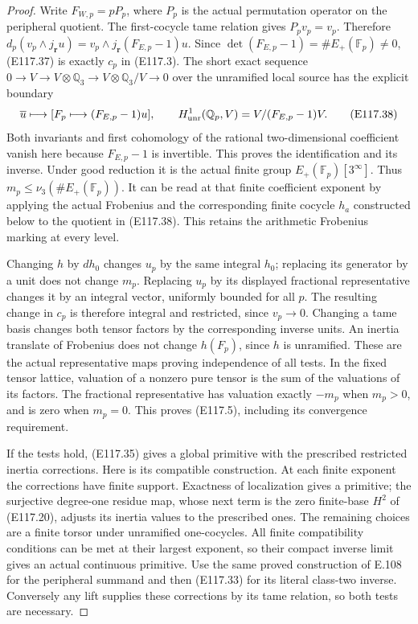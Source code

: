 \begin{proof}
Write $F_{W,p}=pP_p$, where $P_p$ is the actual permutation
operator on the peripheral quotient.  The first-cocycle tame
relation gives $P_pv_p=v_p$.  Therefore
$d_p(v_p\wedge j_{\mathbf r}u)
=v_p\wedge j_{\mathbf r}(F_{E,p}-1)u$.
Since $\det(F_{E,p}-1)=\#E_+(\mathbb F_p)\ne0$,
(E117.37) is exactly $c_p$ in (E117.3).
The short exact sequence $0\to V\to V\otimes\mathbb Q_3
\to V\otimes\mathbb Q_3/V\to0$ over the unramified
local source has the explicit boundary
\[
 \overline u\longmapsto
       [F_p\longmapsto(F_{E,p}-1)u],\qquad
 H^1_{\rm unr}(\mathbb Q_p,V)=V/(F_{E,p}-1)V.
 \tag{E117.38}
\]
Both invariants and first cohomology of the rational
two-dimensional coefficient vanish here because $F_{E,p}-1$
is invertible.  This proves the identification and its inverse.
Under good reduction it is the actual finite group
$E_+(\mathbb F_p)[3^\infty]$.
Thus $m_p\le\nu_3(\#E_+(\mathbb F_p))$.
It can be read at that finite coefficient exponent by applying
the actual Frobenius and the corresponding finite cocycle
$h_a$ constructed below to the quotient in (E117.38).
This retains the arithmetic Frobenius marking at every level.

Changing $h$ by $dh_0$ changes $u_p$ by the same integral
$h_0$; replacing its generator by a unit does not change
$m_p$.  Replacing $u_p$ by its displayed fractional
representative changes it by an integral vector, uniformly
bounded for all $p$.  The resulting change in $c_p$ is
therefore integral and restricted, since $v_p\to0$.
Changing a tame basis changes both tensor factors by the
corresponding inverse units.  An inertia translate of Frobenius
does not change $h(F_p)$, since $h$ is unramified.
These are the actual representative maps proving independence
of all tests.
In the fixed tensor lattice, valuation of a nonzero pure tensor
is the sum of the valuations of its factors.
The fractional representative has valuation exactly $-m_p$
when $m_p>0$, and is zero when $m_p=0$.
This proves (E117.5), including its convergence requirement.

If the tests hold, (E117.35) gives a global primitive with
the prescribed restricted inertia corrections.
Here is its compatible construction.  At each finite exponent
the corrections have finite support.  Exactness of localization
gives a primitive; the surjective degree-one residue map, whose
next term is the zero finite-base $H^2$ of (E117.20), adjusts
its inertia values to the prescribed ones.
The remaining choices are a finite torsor under unramified
one-cocycles.  All finite compatibility conditions can be met
at their largest exponent, so their compact inverse limit
gives an actual continuous primitive.
Use the same proved construction of E.108 for the peripheral
summand and then (E117.33) for its literal class-two inverse.
Conversely any lift supplies these corrections by its tame
relation, so both tests are necessary.


\end{proof}
